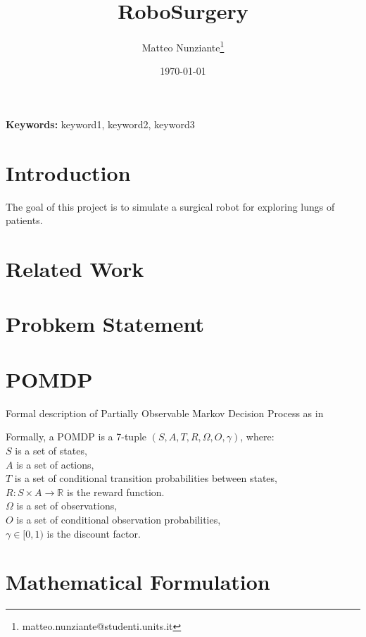 \documentclass[12pt,a4paper]{article}
\title{RoboSurgery}
\author{Matteo Nunziante\thanks{matteo.nunziante@studenti.units.it}}
\date{\today}
\begin{document}
\maketitle

\begin{abstract}

\end{abstract}

\textbf{Keywords:} keyword1, keyword2, keyword3
\newpage


\tableofcontents 
\newpage

\section{Introduction}
The goal of this project is to simulate a surgical robot for exploring lungs of patients.
\section{Related Work}

\section{Probkem Statement}


\section{POMDP}
Formal description of Partially Observable Markov Decision Process as in \cite{Spaan2012}

Formally, a POMDP is a 7-tuple $(S,A,T,R,\Omega,O,\gamma)$, where: \\
  $S$ is a set of states, \\
  $A$ is a set of actions, \\
  $T$ is a set of conditional transition probabilities between states, \\
  $R: S\times A \rightarrow \mathbb{R}$  is the reward function. \\
  $\Omega$ is a set of observations, \\
  $O$ is a set of conditional observation probabilities, \\
  $\gamma \in [0,1)$ is the discount factor.

\newpage
\section{Mathematical Formulation}
\end{document}
